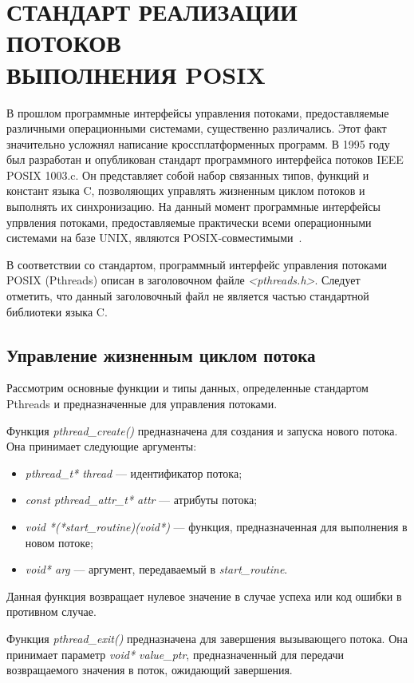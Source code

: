 \section[Стандарт реализации потоков выполнения POSIX]{%
  СТАНДАРТ РЕАЛИЗАЦИИ ПОТОКОВ \\
  ВЫПОЛНЕНИЯ POSIX}

В прошлом программные интерфейсы управления потоками,
предоставляемые различными операционными системами, существенно различались.
Этот факт значительно усложнял написание кроссплатформенных программ.
В 1995 году был разработан и опубликован стандарт
программного интерфейса потоков IEEE POSIX 1003.c.
Он представляет собой набор связанных типов, функций и констант
языка C, позволяющих управлять жизненным циклом потоков
и выполнять их синхронизацию.
На данный момент программные интерфейсы упрвления потоками,
предоставляемые практически всеми операционными системами
на базе UNIX, являются POSIX-совместимыми~\cite{pthreads_programming}.

В соответствии со стандартом, программный интерфейс управления потоками
POSIX (Pthreads) описан в заголовочном файле \textit{<pthreads.h>}.
Следует отметить, что данный заголовочный файл не является частью
стандартной библиотеки языка C.

\subsection{Управление жизненным циклом потока}

Рассмотрим основные функции и типы данных, определенные стандартом Pthreads
и предназначенные для управления потоками.

Функция \textit{pthread\_create()} предназначена для создания и запуска
нового потока.
Она принимает следующие аргументы:
\begin{itemize}
  \item \textit{pthread\_t* thread} --- идентификатор потока;
  \item \textit{const pthread\_attr\_t* attr} --- атрибуты потока;
  \item \textit{void *(*start\_routine)(void*)} --- функция, предназначенная для
    выполнения в новом потоке;
  \item \textit{void* arg} --- аргумент, передаваемый в \textit{start\_routine}.
\end{itemize}
Данная функция возвращает нулевое значение в случае успеха
или код ошибки в противном случае.

Функция \textit{pthread\_exit()} предназначена для завершения вызывающего потока.
Она принимает параметр \textit{void* value\_ptr}, предназначенный для передачи
возвращаемого значения в поток, ожидающий завершения.

